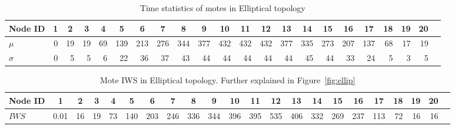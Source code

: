 \documentclass[conference,final]{IEEEtran}
\newcommand*{\bd}[1]{\multicolumn{1}{|c}{\bfseries #1}}
\begin{document}
\begin{table}[t!]
\centering
\begin{tabular}{|l|*{20}{r|}r}
\hline
\bd{Node ID}           & \bd{1} & \bd{2} & \bd{3} & \bd{4} & \bd{5} & \bd{6} & \bd{7} & \bd{8} & \bd{9} & \bd{10} & \bd{11} & \bd{12} & \bd{13} & \bd{14} & \bd{15} & \bd{16} & \bd{17} & \bd{18} & \bd{19} & \bd{20} \\
\hline
$\mu$            & 0 &19 & 19& 69&139 &213&276&344&377&432 &432 &432 &377 &335 &273 & 207&137 & 68 & 17 & 19 \\
$\sigma$		 & 0 & 5 & 5 & 6 & 22 & 36& 37&43 &44 & 44 & 44 & 44 & 44 & 45 & 44  & 33 & 24 & 5 & 3 & 5 \\
\hline
\end{tabular}
\caption{Time statistics of motes in Elliptical topology}
\label{tab:stat_ellip}
\end{table}

\begin{table}[t!]
\centering
\begin{tabular}{|l|*{20}{r|}r}
\hline
\bd{Node ID}           & \bd{1} & \bd{2} & \bd{3} & \bd{4} & \bd{5} & \bd{6} & \bd{7} & \bd{8} & \bd{9} & \bd{10} & \bd{11} & \bd{12} & \bd{13} & \bd{14} & \bd{15} & \bd{16} & \bd{17} & \bd{18} & \bd{19} & \bd{20} \\
\hline
$\mathit{IWS}$
                 &0.01&16 &19 &73 & 140 &203 &246 &336 &344 &396 &395 &535 &406 &332 &269 &237 &113 & 72& 16 & 16 \\
\hline
\end{tabular}
\caption{Mote IWS in Elliptical topology. Further explained in Figure~\ref{fig:ellip}}
\label{tab:iws_ellip}
\end{table}
\end{document}
